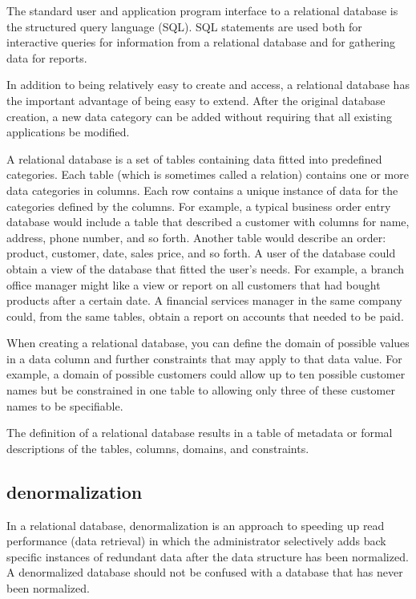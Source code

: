 The standard user and application program interface to a relational database is the structured query language (SQL). SQL statements are used both for interactive queries for information from a relational database and for gathering data for reports.

In addition to being relatively easy to create and access, a relational database has the important advantage of being easy to extend. After the original database creation, a new data category can be added without requiring that all existing applications be modified.

A relational database is a set of tables containing data fitted into predefined categories. Each table (which is sometimes called a relation) contains one or more data categories in columns. Each row contains a unique instance of data for the categories defined by the columns. For example, a typical business order entry database would include a table that described a customer with columns for name, address, phone number, and so forth. Another table would describe an order: product, customer, date, sales price, and so forth. A user of the database could obtain a view of the database that fitted the user's needs. For example, a branch office manager might like a view or report on all customers that had bought products after a certain date. A financial services manager in the same company could, from the same tables, obtain a report on accounts that needed to be paid.

When creating a relational database, you can define the domain of possible values in a data column and further constraints that may apply to that data value. For example, a domain of possible customers could allow up to ten possible customer names but be constrained in one table to allowing only three of these customer names to be specifiable.

The definition of a relational database results in a table of metadata or formal descriptions of the tables, columns, domains, and constraints.


\subsection{denormalization}

In a relational database, denormalization is an approach to speeding up read performance (data retrieval) in which the administrator selectively adds back specific instances of redundant data after the data structure has been normalized. A denormalized database should not be confused with a database that has never been normalized.

